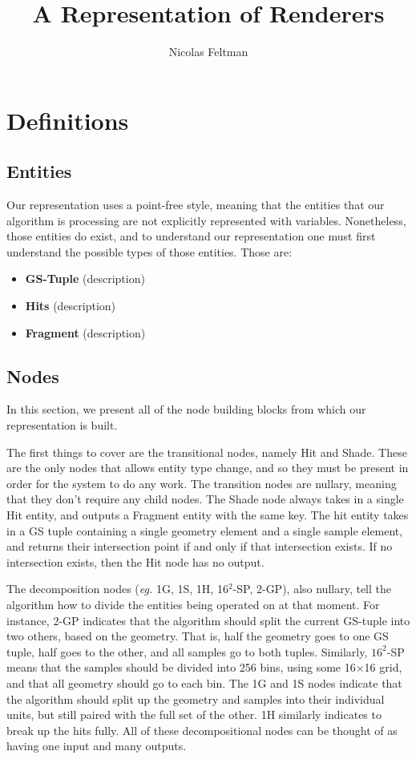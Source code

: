 \documentclass{article}
\title{\Large\textbf{A Representation of Renderers}}
\author{Nicolas Feltman}
\begin{document}
\maketitle

\section{Definitions}

\subsection{Entities}

Our representation uses a point-free style, meaning that the entities that our algorithm is processing are not explicitly represented with variables.  Nonetheless, those entities do exist, and to understand our representation one must first understand the possible types of those entities.  Those are:

\begin{itemize}

\item {\bf GS-Tuple} (description)
\item {\bf Hits} (description)
\item {\bf Fragment} (description)

\end{itemize}

\subsection{Nodes}

In this section, we present all of the node building blocks from which our representation is built.  

The first things to cover are the transitional nodes, namely Hit and Shade.  These are the only nodes that allows entity type change, and so they must be present in order for the system to do any work.  The transition nodes are nullary, meaning that they don't require any child nodes.  The Shade node always takes in a single Hit entity, and outputs a Fragment entity with the same key.  The hit entity takes in a GS tuple containing a single geometry element and a single sample element, and returns their intersection point if and only if that intersection exists.  If no intersection exists, then the Hit node has no output.

The decomposition nodes ({\em eg.} 1G, 1S, 1H, 16$^2$-SP, 2-GP), also nullary, tell the algorithm how to divide the entities being operated on at that moment.  For instance, 2-GP indicates that the algorithm should split the current GS-tuple into two others, based on the geometry.  That is, half the geometry goes to one GS tuple, half goes to the other, and all samples go to both tuples.  Similarly, $16^2$-SP means that the samples should be divided into 256 bins, using some 16$\times$16 grid, and that all geometry should go to each bin.  The 1G and 1S nodes indicate that the algorithm should split up the geometry and samples into their individual units, but still paired with the full set of the other.  1H similarly indicates to break up the hits fully.  All of these decompositional nodes can be thought of as having one input and many outputs.
\end{document}

